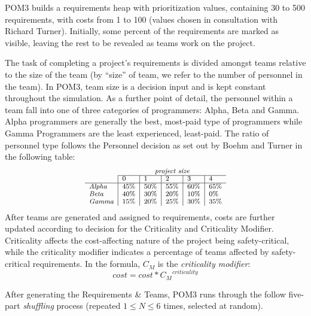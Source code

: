 \documentclass[10pt,journal,compsoc]{IEEEtran}
\begin{document}
   POM3 builds a requirements heap with prioritization values,
    containing
     30 to 500 requirements, with costs from 1 to 100 (values 
     chosen in consultation with Richard Turner).  Initially,
    some percent of the requirements are marked
    as visible, leaving the rest to be revealed as teams work on the
    project.

The task of completing a project's requirements is divided amongst teams
    relative to the size of the team (by ``size'' of team, we refer to
    the number of personnel in the team).  In POM3, team size is a decision
    input and is kept constant throughout the simulation.  As a further
    point of detail, the personnel within a team fall into one of three
    categories of programmers: Alpha, Beta and Gamma.  Alpha programmers
    are generally the best, most-paid type of programmers while Gamma
    Programmers are the least experienced, least-paid.  The ratio of personnel type
    follows the Personnel decision as set out by Boehm and Turner\cite{1204376} in the following table:    
    \[\scriptsize
    \begin{array}{l|l|l|l|l|l}
             \multicolumn{1}{c}{~}   & \multicolumn{5}{c}{\textit{project size}}\\\cline{2-6}
                & 0    & 1    & 2    & 3    & 4    \\ \hline
            \textit{Alpha} & 45\% & 50\% & 55\% & 60\% & 65\% \\ 
            \textit{Beta}  & 40\% & 30\% & 20\% & 10\% & 0\%  \\ 
            \textit{Gamma} & 15\% & 20\% & 25\% & 30\% & 35\% \\ 
        \end{array}
    \]
    After teams are generated and assigned to requirements, costs are
    further updated according to decision for the Criticality and
    Criticality Modifier.  Criticality affects the
    cost-affecting nature of the project being safety-critical, while the
    criticality modifier indicates a percentage of teams affected by
    safety-critical requirements.  In the formula, $C_M$ is the {\em criticality
    modifier}:
    \begin{equation}\label{eq:cmcrit}
    \textit{cost} = \textit{cost} * {C_M}^{\textit{criticality}}
    \end{equation}
    
After generating the Requirements \& Teams, POM3 runs through the follow five-part {\em shuffling} process (repeated   \mbox{$1 \le N \le 6$} times, selected at random).
    
\end{document}
